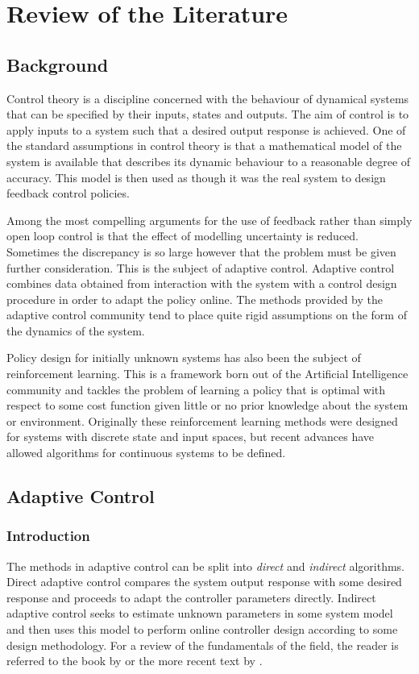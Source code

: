 \chapter{R\lowercase{eview of the} L\lowercase{iterature}}


\section{Background}

Control theory is a discipline concerned with the behaviour of dynamical systems that can be specified by their inputs, states and outputs. The aim of control is to apply inputs to a system such that a desired output response is achieved. One of the standard assumptions in control theory is that a mathematical model of the system is available that describes its dynamic behaviour to a reasonable degree of accuracy. This model is then used as though it was the real system to design feedback control policies.

Among the most compelling arguments for the use of feedback rather than simply open loop control is that the effect of modelling uncertainty is reduced. Sometimes the discrepancy is so large however that the problem must be given further consideration. This is the subject of adaptive control. Adaptive control combines data obtained from interaction with the system with a control design procedure in order to adapt the policy online. The methods provided by the adaptive control community tend to place quite rigid assumptions on the form of the dynamics of the system.

Policy design for initially unknown systems has also been the subject of reinforcement learning. This is a framework born out of the Artificial Intelligence community and tackles the problem of learning a policy that is optimal with respect to some cost function given little or no prior knowledge about the system or environment. Originally these reinforcement learning methods were designed for systems with discrete state and input spaces, but recent advances have allowed algorithms for continuous systems to be defined.







\section{Adaptive Control}
\subsection{Introduction}
The methods in adaptive control can be split into \textit{direct} and \textit{indirect} algorithms. Direct adaptive control compares the system output response with some desired response and proceeds to adapt the controller parameters directly. Indirect adaptive control seeks to estimate unknown parameters in some system model and then uses this model to perform online controller design according to some design methodology. For a review of the fundamentals of the field, the reader is referred to the book by \cite{AsWi94} or the more recent text by \cite{IoFi06}.

